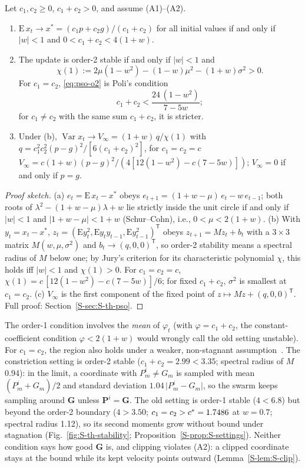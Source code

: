 \begin{proposition}\label{prop:pso-stability}
Let $c_1,c_2\ge0$, $c_1+c_2>0$, and assume (A1)--(A2).
\begin{enumerate}
\item[(a)] $\mathrm E\,x_t\to x^*=(c_1p+c_2g)/(c_1+c_2)$ for all initial values if and only if $\lvert w\rvert<1$ and $0<c_1+c_2<4(1+w)$.
\item[(b)] The update is order-2 stable if and only if $\lvert w\rvert<1$ and
\begin{equation}
\chi(1):=2\mu(1-w^2)-(1-w)\mu^2-(1+w)\sigma^2>0 .
\label{eq:pso-o2}
\end{equation}
For $c_1=c_2$, \eqref{eq:pso-o2} is Poli's condition~\cite{Poli2009}
\begin{equation}
c_1+c_2<\frac{24\,(1-w^2)}{7-5w};
\label{eq:poli}
\end{equation}
for $c_1\ne c_2$ with the same sum $c_1+c_2$, it is stricter.
\item[(c)] Under (b), $\operatorname{Var}x_t\to V_\infty=(1+w)\,q/\chi(1)$ with $q=c_1^2c_2^2(p-g)^2/[6(c_1+c_2)^2]$, for $c_1=c_2=c$ $V_\infty=c(1+w)(p-g)^2/(4[12(1-w^2)-c(7-5w)])$; $V_\infty=0$ if and only if $p=g$.
\end{enumerate}
\end{proposition}
\begin{proof}[Proof sketch]
(a) $e_t=\mathrm E\,x_t-x^*$ obeys $e_{t+1}=(1+w-\mu)\,e_t-w\,e_{t-1}$; both roots of $\lambda^2-(1+w-\mu)\lambda+w$ lie strictly inside the unit circle if and only if $\lvert w\rvert<1$ and $\lvert 1+w-\mu\rvert<1+w$ (Schur--Cohn), i.e., $0<\mu<2(1+w)$. (b) With $y_t=x_t-x^*$, $z_t=(\mathrm Ey_t^2,\mathrm Ey_ty_{t-1},\mathrm Ey_{t-1}^2)^{\mathsf T}$ obeys $z_{t+1}=Mz_t+b_t$ with a $3\times3$ matrix $M(w,\mu,\sigma^2)$ and $b_t\to(q,0,0)^{\mathsf T}$, so order-2 stability means a spectral radius of $M$ below one; by Jury's criterion for its characteristic polynomial $\chi$, this holds iff $\lvert w\rvert<1$ and $\chi(1)>0$. For $c_1=c_2=c$, $\chi(1)=c\,[12(1-w^2)-c(7-5w)]/6$; for fixed $c_1+c_2$, $\sigma^2$ is smallest at $c_1=c_2$. (c) $V_\infty$ is the first component of the fixed point of $z\mapsto Mz+(q,0,0)^{\mathsf T}$. Full proof: Section~\ref{S-sec:S-th-pso}.
\end{proof}
The order-1 condition involves the \emph{mean} of $\varphi_t$ (with $\varphi=c_1+c_2$, the constant-coefficient condition $\varphi<2(1+w)$ would wrongly call the old setting unstable). For $c_1=c_2$, the region also holds under a weaker, non-stagnant assumption~\cite{Cleghorn2018}. The constriction setting is order-2 stable ($c_1+c_2=2.99<3.35$; spectral radius of $M$ 0.94): in the limit, a coordinate with $P^i_m\ne G_m$ is sampled with mean $(P^i_m+G_m)/2$ and standard deviation $1.04\,\lvert P^i_m-G_m\rvert$, so the swarm keeps sampling around $\mathbf G$ unless $\mathbf P^i=\mathbf G$. The old setting is order-1 stable ($4<6.8$) but beyond the order-2 boundary ($4>3.50$; $c_1=c_2>c^*=1.7486$ at $w=0.7$; spectral radius 1.12), so its second moments grow without bound under stagnation (Fig.~\ref{fig:S-th-stability}; Proposition~\ref{S-prop:S-settings}). Neither condition says how good $\mathbf G$ is, and clipping violates (A2): a clipped coordinate stays at the bound while its kept velocity points outward (Lemma~\ref{S-lem:S-clip}).
